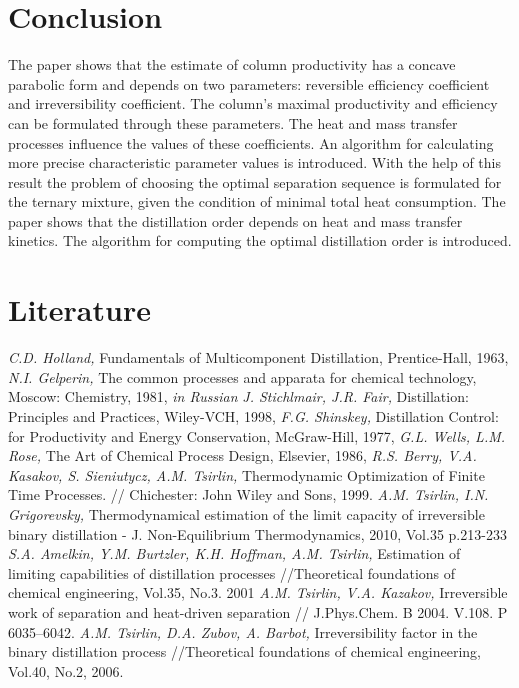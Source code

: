 \documentclass[12pt]{article}
\begin{document}
\section {Conclusion}
The paper shows that the estimate of column productivity has a concave parabolic form and depends on two parameters: reversible efficiency coefficient and irreversibility coefficient. The column's maximal productivity and efficiency can be formulated through these parameters. The heat and mass transfer processes influence the values of these coefficients. An algorithm for calculating more precise characteristic parameter values is introduced.
With the help of this result the problem of choosing the optimal separation sequence  is formulated for the ternary mixture, given the condition of minimal total heat consumption. The paper shows that the distillation order depends on heat and mass transfer kinetics. The algorithm for computing the optimal distillation order is introduced.



\newpage
\section*{Literature}
\begin{enumerate}
{\it C.D. Holland,} Fundamentals of Multicomponent Distillation, Prentice-Hall, 1963,
{\it N.I. Gelperin,} The common processes and apparata for chemical technology, Moscow: Chemistry, 1981, \textit{in Russian}
{\it J. Stichlmair, J.R. Fair,} Distillation: Principles and Practices, Wiley-VCH, 1998,
{\it F.G. Shinskey,} Distillation Control: for Productivity and Energy Conservation, McGraw-Hill, 1977,
{\it G.L. Wells, L.M. Rose,} The Art of Chemical Process Design, Elsevier, 1986,
{\it R.S. Berry, V.A. Kasakov, S. Sieniutycz, A.M. Tsirlin,} Thermodynamic Optimization of Finite Time Processes. // 
Chichester: John Wiley and Sons, 1999.
{\it A.M. Tsirlin, I.N. Grigorevsky,} Thermodynamical estimation of the limit capacity of irreversible binary distillation -  J. Non-Equilibrium Thermodynamics, 2010, Vol.35 p.213-233
{\it S.A. Amelkin, Y.M. Burtzler, K.H. Hoffman, A.M. Tsirlin,} Estimation of limiting capabilities of distillation processes //Theoretical foundations of chemical engineering, Vol.35, No.3. 2001
{\it A.M. Tsirlin, V.A. Kazakov,} Irreversible work of separation and heat-driven separation // J.Phys.Chem. B 2004. V.108. P 6035--6042.
{\it A.M. Tsirlin, D.A. Zubov, A. Barbot,} Irreversibility factor in the binary distillation process //Theoretical foundations of chemical engineering, Vol.40, No.2, 2006.
\end{enumerate}
\end{document}
